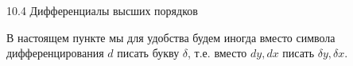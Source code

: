 \documentclass{article}
\begin{document}
10.4 Дифференциалы высших порядков







В настоящем пункте мы для удобства будем иногда вместо символа дифференцирования $d$ писать букву $\delta$, т.е. вместо $dy,dx$ писать $\delta y,\delta x$.
\end{document}

